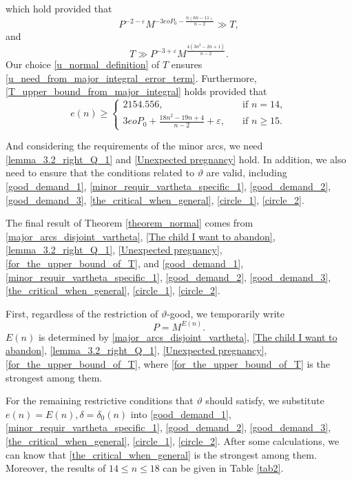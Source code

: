 \documentclass[12pt]{amsart}
\theoremstyle{definition}
\numberwithin{equation}{section}
\begin{document}
which hold provided that
\begin{equation}
\label{T_upper_bound_from_major_integral}
    P^{-2-\varepsilon}M^{-3eoP_0-\frac{n(6n-11)}{n-2}} \gg T,
\end{equation}
and
\begin{equation}
\label{u_need_from_major_integral_error_term}
     T \gg P^{-3+\varepsilon}M^{\frac{4(3n^2-2n+1)}{n-2}}.
\end{equation}
Our choice \eqref{u_normal_definition} of $T$ ensures \eqref{u_need_from_major_integral_error_term}. Furthermore, \eqref{T_upper_bound_from_major_integral} holds provided that
\begin{equation}
\label{for_the_upper_bound_of_T}
    e(n) \geq
    \begin{cases}
    2154.556, \quad &\text{if } n =14,\\
    3eoP_0+\frac{18n^2-19n+4}{n-2}+\varepsilon, \quad &\text{if }n\geq 15.
    \end{cases}
\end{equation}

And considering the requirements of the minor arcs, we need \eqref{lemma_3.2_right_Q_1} and \eqref{Unexpected pregnancy} hold. In addition, we also need to ensure that the conditions related to $\vartheta$ are valid, including 
\eqref{good_demand_1},
\eqref{minor_requir_vartheta_specific_1}, \eqref{good_demand_2}, 
\eqref{good_demand_3}, \eqref{the_critical_when_general}, \eqref{circle_1}, 
\eqref{circle_2}.


The final result of Theorem \ref{theorem_normal} comes from 
\eqref{major_arcs_disjoint_vartheta},
\eqref{The child I want to abandon},
\eqref{lemma_3.2_right_Q_1},
\eqref{Unexpected pregnancy},
\eqref{for_the_upper_bound_of_T},
and
\eqref{good_demand_1},
\eqref{minor_requir_vartheta_specific_1}, \eqref{good_demand_2}, 
\eqref{good_demand_3}, \eqref{the_critical_when_general}, \eqref{circle_1}, 
\eqref{circle_2}.



First, regardless of the restriction of $\vartheta$-good, we temporarily write
\begin{equation*}
    P=M^{E(n)}.
\end{equation*}
$E(n)$ is determined by \eqref{major_arcs_disjoint_vartheta},
\eqref{The child I want to abandon},
\eqref{lemma_3.2_right_Q_1}, \eqref{Unexpected pregnancy},
\eqref{for_the_upper_bound_of_T}, where \eqref{for_the_upper_bound_of_T} is the strongest among them.

For the remaining restrictive conditions that $\vartheta$ should satisfy, we substitute $e(n)=E(n), \delta=\delta_0(n)$ into \eqref{good_demand_1},
\eqref{minor_requir_vartheta_specific_1}, \eqref{good_demand_2}, 
\eqref{good_demand_3}, \eqref{the_critical_when_general}, \eqref{circle_1}, 
\eqref{circle_2}. 
After some calculations, we can know that \eqref{the_critical_when_general} is the strongest among them. Moreover, 
the results of $14 \leq n \leq 18$  can be given in Table \ref{tab2}.
\end{document}
